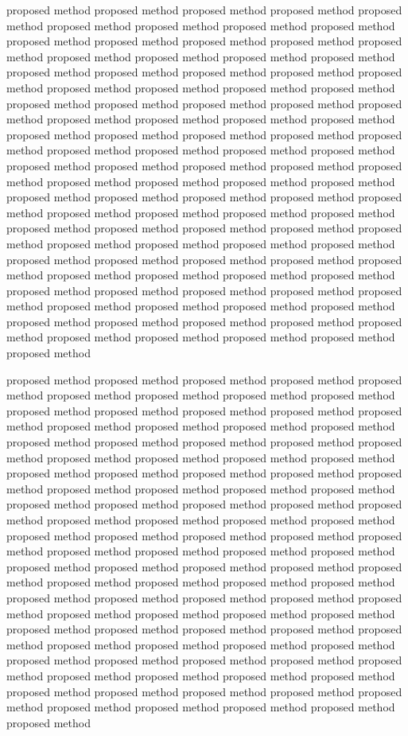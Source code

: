\documentclass[platex,ja=standard,12pt,a4paper,twoside,onecolumn,fleqn,dvipdfmx,english]{bxjsbook}
\begin{document}
proposed method proposed method proposed method proposed method proposed method proposed method proposed method proposed method proposed method proposed method proposed method proposed method proposed method proposed method proposed method proposed method proposed method proposed method proposed method proposed method proposed method proposed method proposed method proposed method proposed method proposed method proposed method proposed method proposed method proposed method proposed method proposed method proposed method proposed method proposed method proposed method proposed method proposed method proposed method proposed method proposed method proposed method proposed method proposed method proposed method proposed method proposed method proposed method proposed method proposed method proposed method proposed method proposed method proposed method proposed method proposed method proposed method proposed method proposed method proposed method proposed method proposed method proposed method proposed method proposed method proposed method proposed method proposed method proposed method proposed method proposed method proposed method proposed method proposed method proposed method proposed method proposed method proposed method proposed method proposed method proposed method proposed method proposed method proposed method proposed method proposed method proposed method proposed method proposed method proposed method proposed method proposed method proposed method proposed method proposed method proposed method proposed method proposed method proposed method proposed method

proposed method proposed method proposed method proposed method proposed method proposed method proposed method proposed method proposed method proposed method proposed method proposed method proposed method proposed method proposed method proposed method proposed method proposed method proposed method proposed method proposed method proposed method proposed method proposed method proposed method proposed method proposed method proposed method proposed method proposed method proposed method proposed method proposed method proposed method proposed method proposed method proposed method proposed method proposed method proposed method proposed method proposed method proposed method proposed method proposed method proposed method proposed method proposed method proposed method proposed method proposed method proposed method proposed method proposed method proposed method proposed method proposed method proposed method proposed method proposed method proposed method proposed method proposed method proposed method proposed method proposed method proposed method proposed method proposed method proposed method proposed method proposed method proposed method proposed method proposed method proposed method proposed method proposed method proposed method proposed method proposed method proposed method proposed method proposed method proposed method proposed method proposed method proposed method proposed method proposed method proposed method proposed method proposed method proposed method proposed method proposed method proposed method proposed method proposed method proposed method
\end{document}
